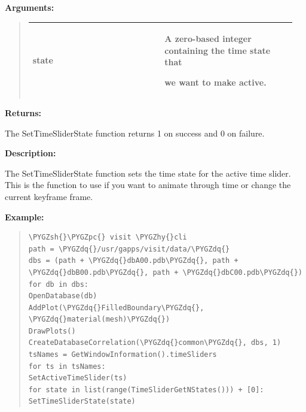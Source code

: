 \documentclass[letterpaper,10pt,english]{sphinxmanual}
\def\PYGZsh{\char`\#}
\def\PYGZpc{\char`\%}
\def\PYGZhy{\char`\-}
\def\PYGZdq{\char`\"}
\begin{document}
\begin{DUlineblock}{0em}
\item[] 
\item[] \textbf{Arguments:}
\end{DUlineblock}
\begin{quote}

\begin{tabular}{|p{0.475\linewidth}|p{0.475\linewidth}|}
\hline

state
 & 
\begin{DUlineblock}{0em}
\item[] A zero-based integer containing the time state that
\item[] we want to make active.
\end{DUlineblock}
\\
\hline\end{tabular}

\end{quote}

\begin{DUlineblock}{0em}
\item[] 
\item[] \textbf{Returns:}
\item[] The SetTimeSliderState function returns 1 on success and 0 on failure.
\item[] 
\item[] \textbf{Description:}
\item[] The SetTimeSliderState function sets the time state for the active time
slider. This is the function to use if you want to animate through time or
change the current keyframe frame.
\end{DUlineblock}

\begin{DUlineblock}{0em}
\item[] 
\end{DUlineblock}

\begin{DUlineblock}{0em}
\item[] \textbf{Example:}
\item[] 
\end{DUlineblock}
\begin{quote}

\begin{Verbatim}[commandchars=\\\{\}]
\PYGZsh{}\PYGZpc{} visit \PYGZhy{}cli
path = \PYGZdq{}/usr/gapps/visit/data/\PYGZdq{}
dbs = (path + \PYGZdq{}dbA00.pdb\PYGZdq{}, path + \PYGZdq{}dbB00.pdb\PYGZdq{}, path + \PYGZdq{}dbC00.pdb\PYGZdq{})
for db in dbs:
OpenDatabase(db)
AddPlot(\PYGZdq{}FilledBoundary\PYGZdq{}, \PYGZdq{}material(mesh)\PYGZdq{})
DrawPlots()
CreateDatabaseCorrelation(\PYGZdq{}common\PYGZdq{}, dbs, 1)
tsNames = GetWindowInformation().timeSliders
for ts in tsNames:
SetActiveTimeSlider(ts)
for state in list(range(TimeSliderGetNStates())) + [0]:
SetTimeSliderState(state)
\end{Verbatim}
\end{quote}
\end{document}
